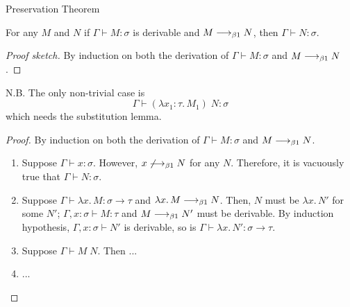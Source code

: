 \begin{frame}[allowframebreaks] {Preservation Theorem}
  \begin{theorem}
    For any $M$ and $N$ if $\Gamma \vdash M : \sigma$ is derivable and $M \longrightarrow_{\beta1} N$, then $\Gamma \vdash N : \sigma$. 
  \end{theorem}
  \begin{proof}[Proof sketch]
    By induction on both the derivation of $\Gamma \vdash M :
    \sigma$ and $M \longrightarrow_{\beta1} N$.
  \end{proof}
  N.B. The only non-trivial case is
  \[
    \Gamma \vdash (\lambda  x_1 : \tau .\, M_1)\; N : \sigma%
  \]
  which needs the substitution lemma.
  
  \begin{proof}
  By induction on both the derivation of $\Gamma \vdash M :
  \sigma$ and $M \longrightarrow_{\beta1} N$.

  \begin{enumerate}
    \item Suppose $\Gamma \vdash x : \sigma$.
      However, $x \not\longrightarrow_{\beta1} N$ for any $N$.
      Therefore, it is vacuously true that $\Gamma \vdash N : \sigma$.
    \item Suppose $\Gamma \vdash \lambda x.\, M : \sigma \to \tau$ and $\lambda x.\, M \longrightarrow_{\beta1} N$.
      Then, $N$ must be $\lambda x.\, N'$ for some $N'$; $\Gamma, x : \sigma \vdash M \colon \tau$ and $M \longrightarrow_{\beta1} N'$ must be derivable.
      By induction hypothesis, $\Gamma, x : \sigma \vdash N'$ is derivable, so is $\Gamma \vdash \lambda x.\, N'\colon \sigma \to \tau$.
    \item Suppose $\Gamma \vdash M\; N$.
      Then ...
    \item ...
  \end{enumerate}
\end{proof}
  
\end{frame}

